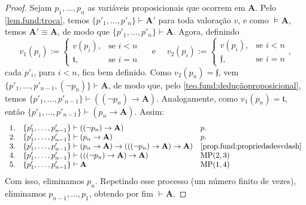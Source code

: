 \begin{proof}
    Sejam $p_1, \ldots, p_n$ as variáveis proposicionais que ocorrem em $\mathbf{A}$. Pelo \cref{lem.fund:troca}, temos $\{p'_1, \ldots, p'_n \} \vdash \mathbf{A}'$ para toda valoração $v$, e como $\vDash \mathbf{A}$, temos $\mathbf{A}' \equiv \mathbf{A}$, de modo que $\{p'_1, \ldots, p'_n \} \vdash \mathbf{A}$. Agora, definindo
        \[
            v_1(p_i) :=
                \begin{cases}
                    v(p_i), & \text{se } i < n \\
                    \mathfrak{t}, & \text{se } i = n
                \end{cases}
            \quad \text{ e } \quad
            v_2(p_i) :=
                \begin{cases}
                    v(p_i), & \text{se } i < n \\
                    \mathfrak{f}, & \text{se } i = n
                \end{cases},
        \]
    cada $p'_i$, para $i<n$, fica bem definido. Como $v_2(p_n) = \mathfrak{f}$, vem $\{p'_1, \ldots, p'_{n-1}, (\neg p_n) \} \vdash \mathbf{A}$, de modo que, pelo \cref{teo.fund:deduçãoproposicional}, temos $\{p'_1, \ldots, p'_{n-1}\} \vdash ((\neg p_n) \rightarrow \mathbf{A})$. Analogamente, como $v_1(p_n) = \mathfrak{t}$, então $\{p'_1, \ldots, p'_{n-1}\} \vdash (p_n \rightarrow \mathbf{A})$. Assim:
        \[
            \begin{array}{rll}
                1. & \{p'_1, \ldots, p'_{n-1}\} \vdash ((\neg p_n) \rightarrow \mathbf{A}) & p. \\
                2. & \{p'_1, \ldots, p'_{n-1}\} \vdash (p_n \rightarrow \mathbf{A}) & p. \\
                3. & \{p'_1, \ldots, p'_{n-1}\} \vdash (p_n \rightarrow \mathbf{A}) \rightarrow (((\neg p_n) \rightarrow \mathbf{A}) \rightarrow \mathbf{A}) & \eqref{prop.fund:propriedadesvdash} \\
                4. & \{p'_1, \ldots, p'_{n-1}\} \vdash (((\neg p_n) \rightarrow \mathbf{A}) \rightarrow \mathbf{A}) & \text{MP}(2,3) \\
                5. & \{p'_1, \ldots, p'_{n-1}\} \vdash \mathbf{A} & \text{MP}(1,4)
            \end{array}
        \]
    Com isso, eliminamos $p_n$. Repetindo esse processo (um número finito de vezes), eliminamos $p_{n-1}, \ldots, p_1$, obtendo por fim $\vdash \mathbf{A}$.
    \blackproof
\end{proof}


